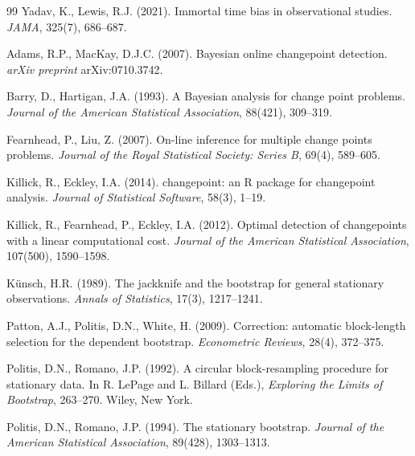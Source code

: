 \documentclass[11pt,a4paper]{article}
\begin{document}
\begin{thebibliography}{99}
Yadav, K., Lewis, R.J. (2021).
Immortal time bias in observational studies.
\textit{JAMA}, 325(7), 686--687.


Adams, R.P., MacKay, D.J.C. (2007).
Bayesian online changepoint detection.
\textit{arXiv preprint} arXiv:0710.3742.

Barry, D., Hartigan, J.A. (1993).
A Bayesian analysis for change point problems.
\textit{Journal of the American Statistical Association}, 88(421), 309--319.

Fearnhead, P., Liu, Z. (2007).
On-line inference for multiple change points problems.
\textit{Journal of the Royal Statistical Society: Series B}, 69(4), 589--605.

Killick, R., Eckley, I.A. (2014).
changepoint: an R package for changepoint analysis.
\textit{Journal of Statistical Software}, 58(3), 1--19.

Killick, R., Fearnhead, P., Eckley, I.A. (2012).
Optimal detection of changepoints with a linear computational cost.
\textit{Journal of the American Statistical Association}, 107(500), 1590--1598.


K\"unsch, H.R. (1989).
The jackknife and the bootstrap for general stationary observations.
\textit{Annals of Statistics}, 17(3), 1217--1241.

Patton, A.J., Politis, D.N., White, H. (2009).
Correction: automatic block-length selection for the dependent bootstrap.
\textit{Econometric Reviews}, 28(4), 372--375.

Politis, D.N., Romano, J.P. (1992).
A circular block-resampling procedure for stationary data. In R. LePage and
L. Billard (Eds.), \textit{Exploring the Limits of Bootstrap}, 263--270.
Wiley, New York.

Politis, D.N., Romano, J.P. (1994).
The stationary bootstrap.
\textit{Journal of the American Statistical Association}, 89(428), 1303--1313.


\end{thebibliography}
\end{document}
